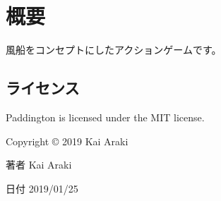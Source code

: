 \hypertarget{index_概要}{}\section{概要}\label{index_概要}
風船をコンセプトにしたアクションゲームです。 \hypertarget{index_ライセンス}{}\subsection{ライセンス}\label{index_ライセンス}
Paddington is licensed under the M\+IT license. ~\newline


Copyright \copyright{} 2019 Kai Araki \begin{DoxyAuthor}{著者}
Kai Araki ~\newline

\end{DoxyAuthor}
\begin{DoxyDate}{日付}
2019/01/25 
\end{DoxyDate}

